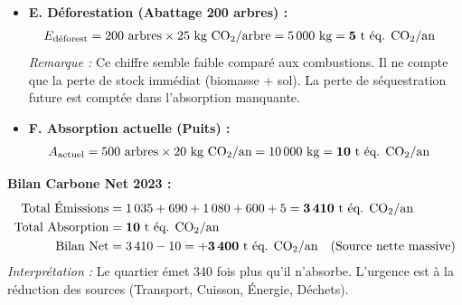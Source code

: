 \documentclass[11pt]{article}
\begin{document}
\begin{exoresolu}
\begin{itemize}
    \item \textbf{E. Déforestation (Abattage 200 arbres) :}
    \begin{align*}
    E_{\text{déforest}} &= 200 \text{ arbres} \times 25 \text{ kg \ce{CO2}/arbre} = 5\,000 \text{ kg} = \mathbf{5 \text{ t éq. \ce{CO2}/an}}
    \end{align*}
    \emph{Remarque :} Ce chiffre semble faible comparé aux combustions. Il ne compte que la perte de stock immédiat (biomasse + sol). La perte de séquestration future est comptée dans l'absorption manquante.

    \item \textbf{F. Absorption actuelle (Puits) :}
    \begin{align*}
    A_{\text{actuel}} &= 500 \text{ arbres} \times 20 \text{ kg \ce{CO2}/an} = 10\,000 \text{ kg} = \mathbf{10 \text{ t éq. \ce{CO2}/an}}
    \end{align*}
\end{itemize}

\textbf{Bilan Carbone Net 2023 :}
\begin{align*}
\text{Total Émissions} &= 1\,035 + 690 + 1\,080 + 600 + 5 = \mathbf{3\,410 \text{ t éq. \ce{CO2}/an}} \\
\text{Total Absorption} &= \mathbf{10 \text{ t éq. \ce{CO2}/an}} \\
\text{Bilan Net} &= 3\,410 - 10 = \mathbf{+3\,400 \text{ t éq. \ce{CO2}/an}} \quad (\text{Source nette massive})
\end{align*}
\emph{Interprétation :} Le quartier émet 340 fois plus qu'il n'absorbe. L'urgence est à la réduction des sources (Transport, Cuisson, Énergie, Déchets).


\end{exoresolu}
\end{document}
